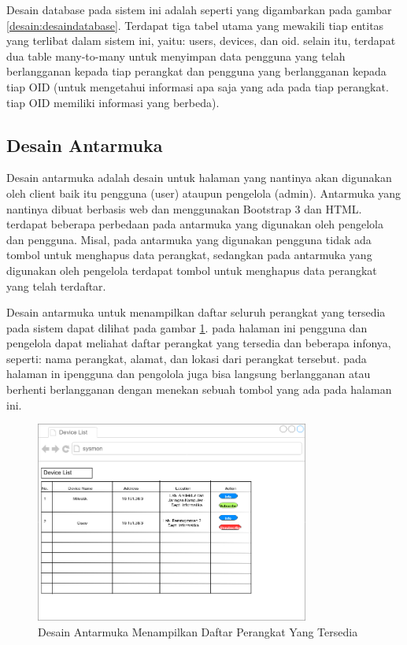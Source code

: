         	Desain database pada sistem ini adalah seperti yang digambarkan pada gambar \ref{desain:desaindatabase}. Terdapat tiga tabel utama yang mewakili tiap entitas yang terlibat dalam sistem ini, yaitu: users, devices, dan oid. selain itu, terdapat dua table many-to-many untuk menyimpan data pengguna yang telah berlangganan kepada tiap perangkat dan pengguna yang berlangganan kepada tiap OID (untuk mengetahui informasi apa saja yang ada pada tiap perangkat. tiap OID memiliki informasi yang berbeda).
        	
		\subsection{Desain Antarmuka}
			Desain antarmuka adalah desain untuk halaman yang nantinya akan digunakan oleh client baik itu pengguna (user) ataupun pengelola (admin). Antarmuka yang nantinya dibuat berbasis web dan  menggunakan Bootstrap 3 dan HTML. terdapat beberapa perbedaan pada antarmuka yang digunakan oleh pengelola dan pengguna. Misal, pada antarmuka yang digunakan pengguna tidak ada tombol untuk menghapus data perangkat, sedangkan pada antarmuka yang digunakan oleh pengelola terdapat tombol untuk menghapus data perangkat yang telah terdaftar.
			
			Desain antarmuka untuk menampilkan daftar seluruh perangkat yang tersedia pada sistem dapat dilihat pada gambar \ref{desain:antarmuka1}. pada halaman ini pengguna dan pengelola dapat meliahat daftar perangkat yang tersedia dan beberapa infonya, seperti: nama perangkat, alamat, dan lokasi dari perangkat tersebut. pada halaman in ipengguna dan pengolola juga bisa langsung berlangganan atau berhenti berlangganan dengan menekan sebuah tombol yang ada pada halaman ini.
        	\begin{figure}[H]
        		\centering
        		\includegraphics[width=9cm]{Images/C-3/antarmuka1.png}
        		\caption{Desain Antarmuka Menampilkan Daftar Perangkat Yang Tersedia}
        		\label{desain:antarmuka1}
        	\end{figure}
        
